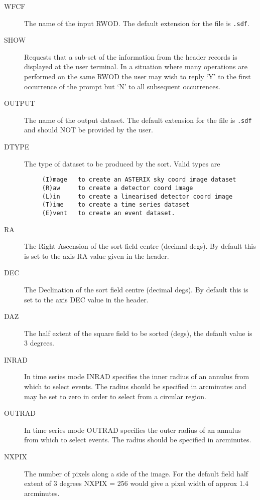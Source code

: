 \begin{description}

\item[WFCF]
The name of the input RWOD.  The default extension for the file is {\tt .sdf}.

\item[SHOW]
Requests that a sub-set of the information from the header records
is displayed at the user terminal. In a situation where many
operations are performed on the same RWOD the user may wish to reply
`Y' to the first occurrence of the prompt but `N' to all subsequent
occurrences.

\item[OUTPUT]
The name of the output dataset. The default extension for the file is 
{\tt .sdf} and should NOT be provided by the user.

\item[DTYPE]
The type of dataset to be produced by the sort. Valid types are

\begin{verbatim}
     (I)mage   to create an ASTERIX sky coord image dataset
     (R)aw     to create a detector coord image
     (L)in     to create a linearised detector coord image
     (T)ime    to create a time series dataset
     (E)vent   to create an event dataset.
\end{verbatim}

\item[RA]
The Right Ascension of the sort field centre (decimal degs). By default this
is set to the axis RA value  given in the header.

\item[DEC]
The Declination of the sort field centre (decimal degs). By default this
is set to the axis DEC value in the header.

\item[DAZ]
The half extent of the square field to be sorted (degs), 
the default value is 3 degrees.

\item[INRAD]
In time series mode INRAD specifies the inner radius of an annulus
from which to select events. The radius should be specified in arcminutes
and may be set to zero in order to select from a circular region.

\item[OUTRAD]
In time series mode OUTRAD specifies the outer radius of an annulus
from which to select events. The radius should be specified in arcminutes.

\item[NXPIX]
The number of pixels along a side of the image. For the default field
half extent of 3 degrees NXPIX = 256 would give a pixel width of approx
1.4 arcminutes.


\end{description}
